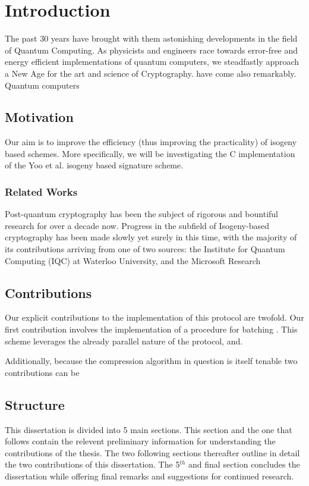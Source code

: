 \chapter{Introduction}

The past 30 years have brought with them astonishing developments in the field of Quantum Computing. As physicists and engineers race towards error-free and energy efficient implementations of quantum computers, we steadfastly approach a New Age for the art and science of Cryptography.  have come also remarkably. Quantum computers 

\section{Motivation}

Our aim is to improve the efficiency (thus improving the practicality) of isogeny based schemes. More specifically, we will be investigating the C implementation of the Yoo et al. isogeny based signature scheme. 

\subsection{Related Works}

Post-quantum cryptography has been the subject of rigorous and bountiful research for over a decade now. Progress in the subfield of Isogeny-based cryptography has been made slowly yet surely in this time, with the majority of its contributions arriving from one of two sources: the Institute for Quantum Computing (IQC) at Waterloo University, and the Microsoft Research  

\section{Contributions}

Our explicit contributions to the implementation of this protocol are twofold. Our first contribution involves the implementation of a procedure for batching . This scheme leverages the already parallel nature of the protocol, and.

Additionally, because the compression algorithm in question is itself tenable two contributions can be 


\section{Structure}

This dissertation is divided into 5 main sections. This section and the one that follows contain the relevent preliminary information for understanding the contributions of the thesis. The two following sections thereafter outline in detail the two contributions of this dissertation. The 5$^{th}$ and final section concludes the dissertation while offering final remarks and suggestions for continued research. 

